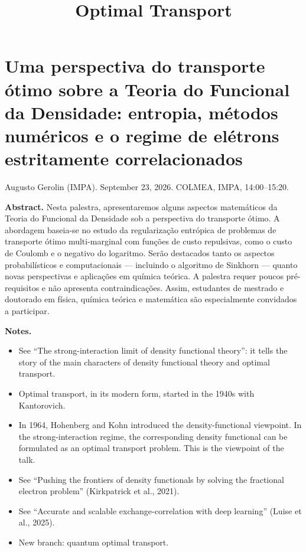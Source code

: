 



\title{Optimal Transport}
\maketitle

\label{section-phantom}

\tableofcontents

\section{Uma perspectiva do transporte
ótimo sobre a Teoria do Funcional da
Densidade: entropia, métodos numéricos e o
regime de elétrons estritamente
correlacionados}
\label{section-gerolin-colmea-2026}

\noindent
Augusto Gerolin (IMPA).
September 23, 2026.
COLMEA, IMPA, 14:00--15:20.

\medskip\noindent
{\bf Abstract.}
Nesta palestra, apresentaremos alguns
aspectos matemáticos da Teoria do Funcional
da Densidade sob a perspectiva do transporte
ótimo. A abordagem baseia-se no estudo da
regularização entrópica de problemas de
transporte ótimo multi-marginal com funções
de custo repulsivas, como o custo de Coulomb
e o negativo do logaritmo. Serão destacados
tanto os aspectos probabilísticos e
computacionais --- incluindo o algoritmo de
Sinkhorn --- quanto novas perspectivas e
aplicações em química teórica. A palestra
requer poucos pré-requisitos e não apresenta
contraindicações. Assim, estudantes de
mestrado e doutorado em física, química
teórica e matemática são especialmente
convidados a participar.

\medskip\noindent
{\bf Notes.}
\begin{itemize}
\item
See ``The strong-interaction limit of
density functional theory'': it tells the
story of the main characters of density
functional theory and optimal transport.

\item
Optimal transport, in its modern form,
started in the 1940s with Kantorovich.

\item
In 1964, Hohenberg and Kohn introduced the
density-functional viewpoint. In the
strong-interaction regime, the corresponding
density functional can be formulated as an
optimal transport problem. This is the
viewpoint of the talk.
\item
See ``Pushing the frontiers of density
functionals by solving the fractional
electron problem'' (Kirkpatrick et al.,
2021).

\item
See ``Accurate and scalable
exchange-correlation with deep learning''
(Luise et al., 2025).
\item
New branch: quantum optimal transport.
\end{itemize}

